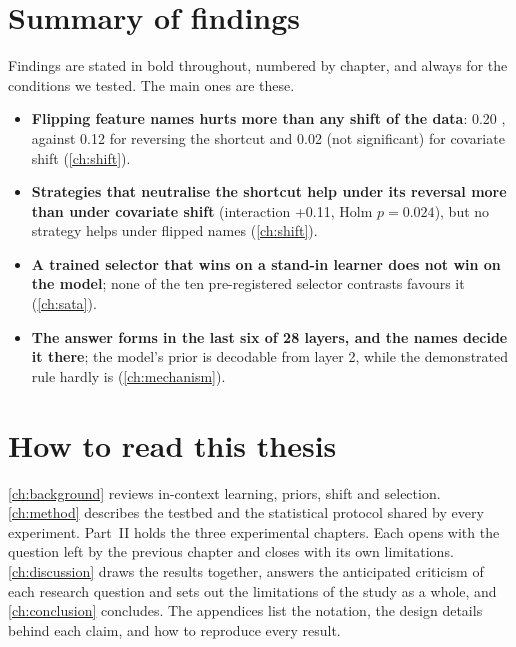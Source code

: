 \section{Summary of findings}

Findings are stated in bold throughout, numbered by chapter, and always for the conditions we tested.
The main ones are these.

\begin{itemize}[leftmargin=1.5em]
  \item \textbf{Flipping feature names hurts more than any shift of the data}: 0.20 \AUROC, against 0.12 for reversing the shortcut and 0.02 (not significant) for covariate shift (\autoref{ch:shift}).
  \item \textbf{Strategies that neutralise the shortcut help under its reversal more than under covariate shift} (interaction +0.11, Holm $p = 0.024$), but no strategy helps under flipped names (\autoref{ch:shift}).
  \item \textbf{A trained selector that wins on a stand-in learner does not win on the model}; none of the ten pre-registered selector contrasts favours it (\autoref{ch:sata}).
  \item \textbf{The answer forms in the last six of 28 layers, and the names decide it there}; the model's prior is decodable from layer 2, while the demonstrated rule hardly is (\autoref{ch:mechanism}).
\end{itemize}

\section{How to read this thesis}

\autoref{ch:background} reviews in-context learning, priors, shift and selection.
\autoref{ch:method} describes the testbed and the statistical protocol shared by every experiment.
Part~II holds the three experimental chapters.
Each opens with the question left by the previous chapter and closes with its own limitations.
\autoref{ch:discussion} draws the results together, answers the anticipated criticism of each research question and sets out the limitations of the study as a whole, and \autoref{ch:conclusion} concludes.
The appendices list the notation, the design details behind each claim, and how to reproduce every result.
